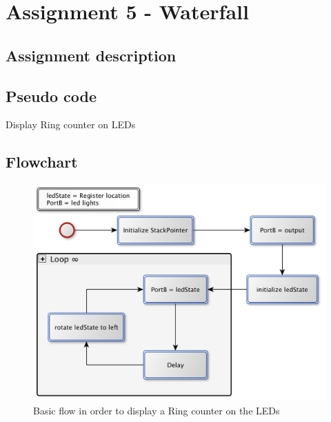 \documentclass[a4paper, 12pt]{article}
\begin{document}
\section{Assignment 5 - Waterfall}

\subsection{Assignment description}


\subsection{Pseudo code}
\begin{algorithm}
\begin{algorithmic}
 
\Repeat
{}
\Until{$\infty$}
\EndProcedure
\caption{Display Ring counter on LEDs}
\label{}
\end{algorithmic}
\end{algorithm}

\subsection{Flowchart}
\begin{figure}[h]
\centering
\includegraphics[scale=0.5]{Flowchart_pics/assignment5_pic.png} 
\caption{Basic flow in order to display a Ring counter on the LEDs}
\label{}
\end{figure}
\end{document}
